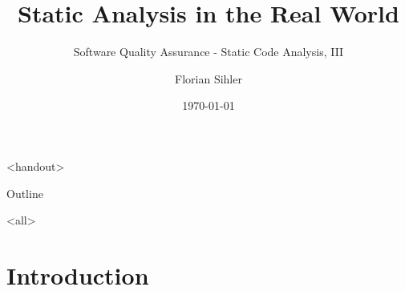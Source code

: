 \documentclass[
   aspectratio=169, %
   10pt, %
   uniqueslidenumber,
   handout,
   professionalfonts
]{beamer}
\title{Static Analysis in the Real World}
\subtitle[SQA]{Software Quality Assurance - Static Code Analysis, III}
\author[F. Sihler]{Florian Sihler}
\date{\today} %
\begin{document}

\mode
<handout>

\begin{frame}{\strut Outline}
\tableofcontents[hideallsubsections]
\end{frame}

\mode
<all>

\section{Introduction}
\end{document}
